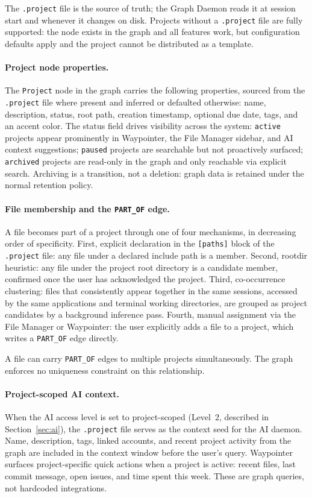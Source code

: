 The \texttt{.project} file is the source of truth; the Graph Daemon reads it
at session start and whenever it changes on disk. Projects without a
\texttt{.project} file are fully supported: the node exists in the graph and
all features work, but configuration defaults apply and the project cannot be
distributed as a template.

\paragraph{Project node properties.}
The \texttt{Project} node in the graph carries the following properties, sourced
from the \texttt{.project} file where present and inferred or defaulted otherwise:
name, description, status, root path, creation timestamp, optional due date, tags,
and an accent color. The status field drives visibility across the system:
\texttt{active} projects appear prominently in Waypointer, the File Manager
sidebar, and AI context suggestions; \texttt{paused} projects are searchable
but not proactively surfaced; \texttt{archived} projects are read-only in the
graph and only reachable via explicit search. Archiving is a transition, not a
deletion: graph data is retained under the normal retention policy.

\paragraph{File membership and the \texttt{PART\_OF} edge.}
A file becomes part of a project through one of four mechanisms, in decreasing
order of specificity. First, explicit declaration in the \texttt{[paths]} block
of the \texttt{.project} file: any file under a declared include path is a
member. Second, rootdir heuristic: any file under the project root directory
is a candidate member, confirmed once the user has acknowledged the project.
Third, co-occurrence clustering: files that consistently appear together in the
same sessions, accessed by the same applications and terminal working directories,
are grouped as project candidates by a background inference pass. Fourth, manual
assignment via the File Manager or Waypointer: the user explicitly adds a file
to a project, which writes a \texttt{PART\_OF} edge directly.

A file can carry \texttt{PART\_OF} edges to multiple projects simultaneously.
The graph enforces no uniqueness constraint on this relationship.

\paragraph{Project-scoped AI context.}
When the AI access level is set to project-scoped (Level~2, described in
Section~\ref{sec:ai}), the \texttt{.project} file serves as the context seed
for the AI daemon. Name, description, tags, linked accounts, and recent
project activity from the graph are included in the context window before the
user's query. Waypointer surfaces project-specific quick actions when a project
is active: recent files, last commit message, open issues, and time spent
this week. These are graph queries, not hardcoded integrations.

